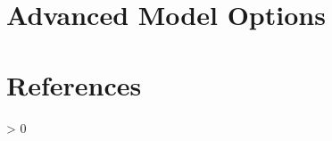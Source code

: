 \documentclass[11pt,
  english,
  letterpaper,
]{article}
\newlength{\cslhangindent}
\newenvironment{CSLReferences}[2] %
 {%
  \setlength{\parindent}{0pt}
  \ifodd #1 \everypar{\setlength{\hangindent}{\cslhangindent}}\ignorespaces\fi
  \ifnum #2 > 0
  \setlength{\parskip}{#2\baselineskip}
  \fi
 }%
 {}
\begin{document}
\leavevmode\tagmcend\tagstructend


\hypertarget{advanced-model-options}{%
\section{Advanced Model Options}\label{advanced-model-options}}

\leavevmode\tagmcend\tagstructend

\clearpage


\hypertarget{references}{%
\section{References}\label{references}}

\leavevmode\tagmcend\tagstructend


\hypertarget{refs}{}
\begin{CSLReferences}{0}{0}
\end{CSLReferences}

\leavevmode\tagmcend\tagstructend
\end{document}
